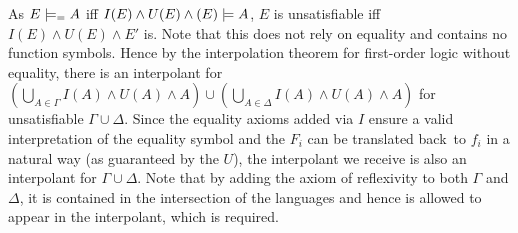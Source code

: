 
As $E \models_= A$ iff $I(E) \land U(E) \land (E) \models A$, $E$ is unsatisfiable iff $I(E) \land U(E) \land E'$ is.
Note that this does not rely on equality and contains no function symbols. Hence by the interpolation theorem for first-order logic without equality, there is an interpolant for $\left(\bigcup_{A\in \Gamma} I(A) \land U(A) \land A\right) \cup \left(\bigcup_{A\in \Delta} I(A) \land U(A) \land A\right) $ for unsatisfiable $\Gamma \cup \Delta$.
Since the equality axioms added via $I$ ensure a valid interpretation of the equality symbol and the $F_i$ can be translated back\ to $f_i$ in a natural way (as guaranteed by the $U$), the interpolant we receive is also an interpolant for $\Gamma \cup \Delta$.
Note that by adding the axiom of reflexivity to both $\Gamma$ and $\Delta$, it is contained in the intersection of the languages and hence is allowed to appear in the interpolant, which is required. 


